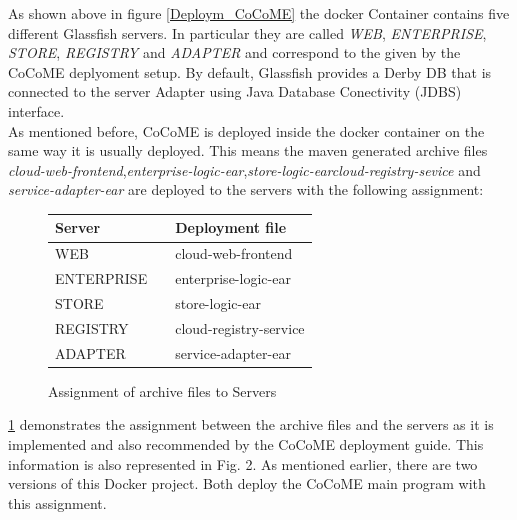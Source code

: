 \documentclass[runningheads]{llncs}
\begin{document}
	As shown above in figure \ref*{Deploym_CoCoME} the docker Container contains five different Glassfish servers. In particular they are called \textit{WEB}, \textit{ENTERPRISE}, \textit{STORE}, \textit{REGISTRY} and \textit{ADAPTER} and correspond to the given by the CoCoME deplyoment setup. By default, Glassfish provides a Derby DB that is connected to the server Adapter using Java Database Conectivity (JDBS) interface.\\
	As mentioned before, CoCoME is deployed inside the docker container on the same way it is usually deployed. This means the maven generated archive files \textit{cloud-web-frontend},\textit{enterprise-logic-ear},\textit{store-logic-ear}\textit{cloud-registry-sevice} and \textit{service-adapter-ear} are deployed to the servers with the following assignment:
	\begin{figure}[H]
		\centering
		\begin{tabular}{p{}|p{}p{}}
			Server && Deployment file \\
			\hline
			WEB && cloud-web-frontend  \\
			ENTERPRISE && enterprise-logic-ear  \\
			STORE && store-logic-ear  \\
			REGISTRY && cloud-registry-service  \\
			ADAPTER && service-adapter-ear \\	
		\end{tabular}
		\caption{Assignment of archive files to Servers}
		\label{table_assignment}
	\end{figure}
	\ref{table_assignment} demonstrates the assignment between the archive files and the servers as it is implemented and also recommended by the CoCoME deployment guide. This information is also represented in Fig. 2. As mentioned earlier, there are two versions of this Docker project. Both deploy the CoCoME main program with this assignment.\\ \\
	
\end{document}
